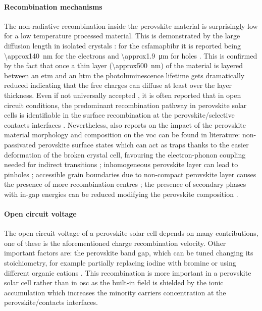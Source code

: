 	\paragraph{Recombination mechanisms}\label{intro_prv_recombination}
	The non-radiative recombination inside the perovskite material is surprisingly low for a low temperature processed material.
	This is demonstrated by the large diffusion length in isolated crystals \cite{Wehrenfennig2014,Wehrenfennig2014a,Stranks2013,Xing2013,Shi2015a,Eperon2014}: for the \gls{csfamapbibr} it is reported being \SI{\approx140}{\nm} for the electrons and \SI{\approx1.9}{\um} for holes \cite{Liu2017}.
	This is confirmed by the fact that once a thin layer (\SI{\approx500}{\nm}) of the material is layered between an \gls{etm} and an \gls{htm} the photoluminescence lifetime gets dramatically reduced \cite{Jimenez-Lopez2017,Eperon2014} indicating that the free charges can diffuse at least over the layer thickness.
	Even if not universally accepted \cite{Valadez-Villalobos2019}, it is often reported that in open circuit conditions, the predominant recombination pathway in perovskite solar cells is identifiable in the surface recombination at the perovskite/selective contacts interfaces \cite{Calado2018b,Stolterfoht2018a,Stolterfoht2018,Gelmetti2019,Shao2016,Correa-Baena2017,Hou2016}.
	Nevertheless, also reports on the impact of the perovskite material morphology and composition on the \gls{voc} can be found in literature: non-passivated perovskite surface states which can act as traps \cite{Zheng2017} thanks to the easier deformation of the broken crystal cell, favouring the electron-phonon coupling needed for indirect transitions \cite{Wu2015}; inhomogeneous perovskite layer can lead to pinholes \cite{Lee2015,Montcada2017,Qiu2016}; accessible grain boundaries due to non-compact perovskite layer causes the presence of more recombination centres \cite{Shao2016a}; the presence of secondary phases with in-gap energies can be reduced modifying the perovskite composition \cite{Bi2016}.

	\paragraph{Open circuit voltage}
	The open circuit voltage of a perovskite solar cell depends on many contributions, one of these is the aforementioned charge recombination velocity.
	Other important factors are: the perovskite band gap, which can be tuned changing its stoichiometry, for example partially replacing iodine with bromine \cite{McMeekin2016,Noh2013a,Wheeler2017} or using different organic cations \cite{Eperon2014}.
	This recombination is more important in a perovskite solar cell rather than in \gls{osc} as the built-in field is shielded by the ionic accumulation which increases the minority carriers concentration at the perovskite/contacts interfaces.

